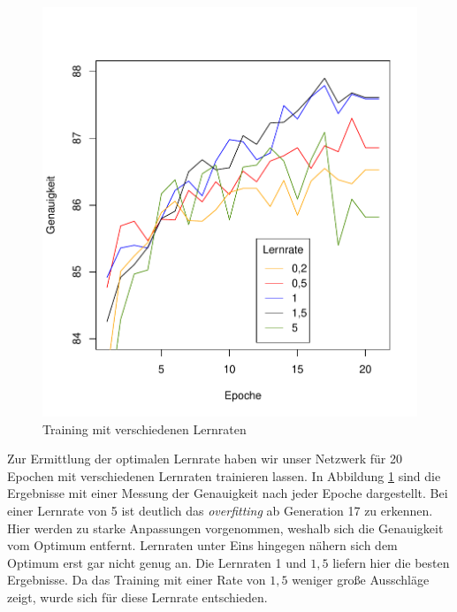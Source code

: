 \begin{figure}[H]
	\centering
	\includegraphics[scale=0.9]{./bilder/learningrate}
	\caption{Training mit verschiedenen Lernraten}
	\label{fig:learningrate}
\end{figure}
Zur Ermittlung der optimalen Lernrate haben wir unser Netzwerk für 20 Epochen mit verschiedenen Lernraten trainieren lassen. In Abbildung \ref{fig:learningrate} sind die Ergebnisse mit einer Messung der Genauigkeit nach jeder Epoche dargestellt. Bei einer Lernrate von 5 ist deutlich das \textit{overfitting} ab Generation 17 zu erkennen. Hier werden zu starke Anpassungen vorgenommen, weshalb sich die Genauigkeit vom Optimum entfernt. Lernraten unter Eins hingegen nähern sich dem Optimum erst gar nicht genug an. Die Lernraten 1 und $1,5$ liefern hier die besten Ergebnisse. Da das Training mit einer Rate von $1,5$ weniger große Ausschläge zeigt, wurde sich für diese Lernrate entschieden.
